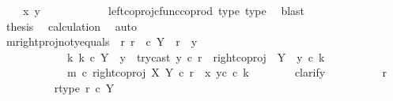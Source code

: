 \begin{isabellebody}
\ {\isachardoublequoteopen}{\isachardot}{\kern0pt}{\isachardot}{\kern0pt}{\isachardot}{\kern0pt}\ {\isacharequal}{\kern0pt}\ \ {\isasymlangle}x{}{\isacharcomma}{\kern0pt}\ y{}{\isasymrangle}{\isachardoublequoteclose}\isanewline
\ \ \ \ \ \ \ \ \ \ \isamarkupfalse%
\ left{\isacharunderscore}{\kern0pt}coproj{\isacharunderscore}{\kern0pt}cfunc{\isacharunderscore}{\kern0pt}coprod\ type{}\ type{}\ \isamarkupfalse%
\ blast\isanewline
\ \ \ \ \ \ \ \ \isamarkupfalse%
\ \isamarkupfalse%
\ {\isacharquery}{\kern0pt}thesis\ \isamarkupfalse%
\ calculation\ \isamarkupfalse%
\ auto\isanewline
\ \ \ \ \ \ \isamarkupfalse%
\isanewline
\isanewline
\ \ \ \ \ \ \isamarkupfalse%
\ m{\isacharunderscore}{\kern0pt}rightproj{\isacharunderscore}{\kern0pt}not{\isacharunderscore}{\kern0pt}y{}{\isacharunderscore}{\kern0pt}equals{\isacharcolon}{\kern0pt}\ {\isachardoublequoteopen}{\isasymAnd}\ r{\isachardot}{\kern0pt}\ r\ \ {\isasymin}\isactrlsub c\ Y\ {\isasymand}\ r\ {\isasymnoteq}\ y{}\ {\isasymLongrightarrow}\isanewline
\ \ \ \ \ \ \ \ \ \ \ \ {\isasymexists}k{\isachardot}{\kern0pt}\ k\ {\isasymin}\isactrlsub c\ Y\ {\isasymsetminus}\ {\isacharparenleft}{\kern0pt}{\isasymone}{\isacharcomma}{\kern0pt}y{}{\isacharparenright}{\kern0pt}\ {\isasymand}\ try{\isacharunderscore}{\kern0pt}cast\ y{}\ {\isasymcirc}\isactrlsub c\ r\ {\isacharequal}{\kern0pt}\ right{\isacharunderscore}{\kern0pt}coproj\ {\isasymone}\ {\isacharparenleft}{\kern0pt}Y\ {\isasymsetminus}\ {\isacharparenleft}{\kern0pt}{\isasymone}{\isacharcomma}{\kern0pt}y{}{\isacharparenright}{\kern0pt}{\isacharparenright}{\kern0pt}\ {\isasymcirc}\isactrlsub c\ k\ {\isasymand}\ \isanewline
\ \ \ \ \ \ \ \ \ \ \ \ m\ {\isasymcirc}\isactrlsub c\ right{\isacharunderscore}{\kern0pt}coproj\ X\ Y\ {\isasymcirc}\isactrlsub c\ r\ {\isacharequal}{\kern0pt}\ {\isasymlangle}x{}{\isacharcomma}{\kern0pt}\ y{}\isactrlsup c\ {\isasymcirc}\isactrlsub c\ k{\isasymrangle}{\isachardoublequoteclose}\isanewline
\ \ \ \ \ \ \isamarkupfalse%
\ clarify\isanewline
\ \ \ \ \ \ \ \ \isamarkupfalse%
\ r\ \isanewline
\ \ \ \ \ \ \ \ \isamarkupfalse%
\ r{\isacharunderscore}{\kern0pt}type{\isacharcolon}{\kern0pt}\ {\isachardoublequoteopen}r\ {\isasymin}\isactrlsub c\ Y{\isachardoublequoteclose}\isanewline
\ \ \ \ \ \ \ \ \isamarkupfalse%

\end{isabellebody}
